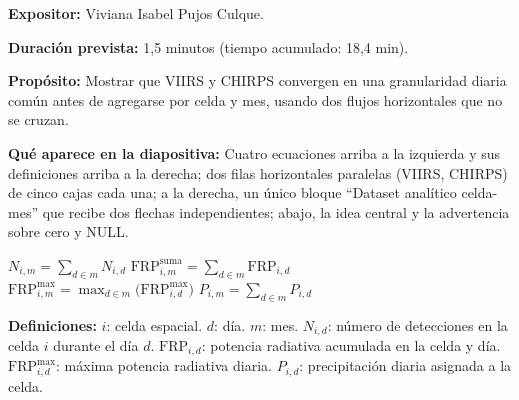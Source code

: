 \documentclass[11pt,a4paper]{article}
\newcommand{\campo}[2]{\par\medskip\noindent\textbf{#1:} #2\par}
\begin{document}
\campo{Expositor}{Viviana Isabel Pujos Culque.}
\campo{Duraci\'on prevista}{1,5 minutos (tiempo acumulado: 18,4 min).}
\campo{Prop\'osito}{Mostrar que VIIRS y CHIRPS convergen en una
granularidad diaria com\'un antes de agregarse por celda y mes, usando
dos flujos horizontales que no se cruzan.}
\campo{Qu\'e aparece en la diapositiva}{Cuatro ecuaciones arriba a la
izquierda y sus definiciones arriba a la derecha; dos filas
horizontales paralelas (VIIRS, CHIRPS) de cinco cajas cada una; a la
derecha, un \'unico bloque ``Dataset anal\'itico celda-mes'' que recibe
dos flechas independientes; abajo, la idea central y la advertencia
sobre cero y NULL.}

\begin{center}
\small
$N_{i,m} = \displaystyle\sum_{d \in m} N_{i,d}$ \qquad
$\mathrm{FRP}^{\mathrm{suma}}_{i,m} = \displaystyle\sum_{d \in m} \mathrm{FRP}_{i,d}$\\[4pt]
$\mathrm{FRP}^{\max}_{i,m} = \displaystyle\max_{d \in m}\bigl(\mathrm{FRP}^{\max}_{i,d}\bigr)$ \qquad
$P_{i,m} = \displaystyle\sum_{d \in m} P_{i,d}$
\end{center}

\textbf{Definiciones:} $i$: celda espacial. $d$: d\'ia. $m$: mes.
$N_{i,d}$: n\'umero de detecciones en la celda $i$ durante el d\'ia
$d$. $\mathrm{FRP}_{i,d}$: potencia radiativa acumulada en la celda y
d\'ia. $\mathrm{FRP}^{\max}_{i,d}$: m\'axima potencia radiativa diaria.
$P_{i,d}$: precipitaci\'on diaria asignada a la celda.
\end{document}
